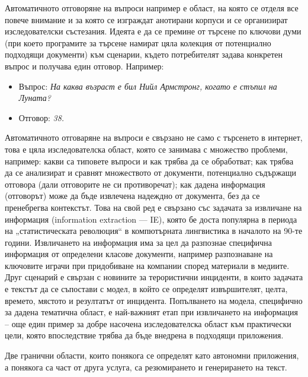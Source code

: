 \documentclass[]{../../metanetpaper}
\begin{document}
\begin{multicols}{2}
Автоматичното отговоряне на въпроси например е област, на която се отделя все повече внимание и за която се изграждат анотирани корпуси и се организират изследователски състезания. Идеята е да се премине от търсене по ключови думи (при което програмите за търсене намират цяла колекция от потенциално
 подходящи документи) към сценарии, където потребителят задава конкретен въпрос и получава един отговор. Например: 

\begin{itemize}
\item[] Въпрос: \textit{На каква възраст е бил Нийл Армстронг, когато е стъпил на Луната?}
\item[] Отговор: \textit{38.}
\end{itemize}

Автоматичното отговаряне на въпроси е свързано не само с търсенето в интернет, това е цяла изследователска област, която се занимава с множество проблеми, например: какви са типовете въпроси и как трябва да се обработват; как трябва да се анализират и сравнят множеството от документи, потенциално
 съдържащи отговора (дали отговорите не си противоречат); как
дадена информация (отговорът) може да бъде извлечена  надеждно от документа, без да се пренебрегва контекстът.
Това на свой ред е свързано със задачата за извличане на информация (information extraction — IE), която бе доста популярна в периода на „статистическата революция“ в компютърната лингвистика в началото на 90-те години. Извличането на информация има за цел да разпознае специфична информация от определени класове документи, например разпознаване на ключовите играчи при
 придобиване на компании според материали в медиите. Друг сценарий е свързан с новините за терористични инциденти, в които задачата е текстът да се съпостави  с модел, в който се определят извършителят, целта, времето, мястото и резултатът от инцидента. Попълването на модела, специфично за дадена тематична област, е най-важният етап при извличането на информация – още
 един пример за добре насочена изследователска област към практически цели, която впоследствие трябва да бъде внедрена в подходящи приложения.


Две гранични области, които понякога се определят като автономни приложения, а понякога са част от друга услуга, са резюмирането и генерирането на текст. 


\end{multicols}
\end{document}
